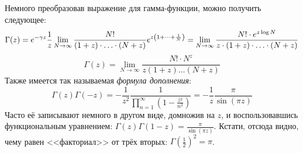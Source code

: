 \documentclass[a4paper]{report}
\begin{document}
    Немного преобразовав выражение для гамма-функции, можно получить следующее:
    \[\Gamma(z) = e^{-\gamma z}\frac{1}{z}\lim\limits_{N \to \infty}\frac{N!}{(1 + z)\cdot\ldots\cdot (N + z)}e^{z\left(1 + \dots + \frac{1}{N}\right)} = \lim\limits_{N \to \infty}\frac{N! \cdot e^{z \log N}}{z\cdot  (1 + z)\cdot\ldots\cdot (N + z)}\]
    $$\Gamma(z) = \lim\limits_{N \to \infty}\frac{N! \cdot N^z}{z(1 + z)\dots (N + z)}$$
    Также имеется так называемая \emph{формула дополнения}:
    \[\Gamma(z)\Gamma(-z) = -\frac{1}{z^2}\frac{1}{\prod\limits_{n = 1}^{\infty}\left(1 - \frac{z^2}{n^2}\right)} = -\frac{1}{z}\frac{\pi}{\sin \left(\pi z\right)}\]
    Часто её записывают немного в другом виде, домножив на $z$, и воспользовавшись функциональным уравнением: $\Gamma(z)\Gamma(1 - z) = \frac{\pi}{\sin \left(\pi z\right)}$.
    Кстати, отсюда видно, чему равен <<факториал>> от трёх вторых: $\Gamma\left(\frac{1}{2}\right)^2 = \pi$.
\end{document}
